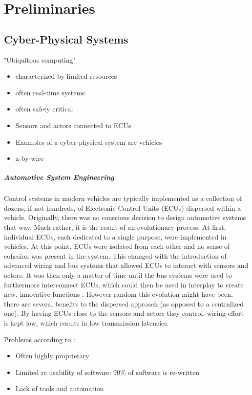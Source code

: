 

\chapter{Preliminaries}\label{chapter:preliminaries}

\section{Cyber-Physical Systems}

"Ubiquitous computing"

\begin{itemize}
\item characterized by limited resources
\item often real-time systems
\item often safety critical
\item Sensors and actors connected to ECUs
\item Examples of a cyber-physical system are vehicles
\item x-by-wire
\end{itemize}


\paragraph{Automotive System Engineering}
Control systems in modern vehicles are typically implemented as a collection of dozens, if not hundreds, of Electronic Control Units (ECUs) dispersed within a vehicle. Originally, there was no conscious decision to design automotive systems that way. Much rather, it is the result of an evolutionary process. At first, individual ECUs, each dedicated to a single purpose, were implemented in vehicles. At this point, ECUs were isolated from each other and no sense of cohesion was present in the system. This changed with the introduction of advanced wiring and bus systems that allowed ECUs to interact with sensors and actors. It was then only a matter of time until the bus systems were used to furthermore interconnect ECUs, which could then be used in interplay to create new, innovative functions \cite{broy2006challenges}. However random this evolution might have been, there are several benefits to the dispersed approach (as opposed to a centralized one). By having ECUs close to the sensors and actors they control, wiring effort is kept low, which results in low transmission latencies. 

Problems according to \citeauthor*{broy2006challenges}:
\begin{itemize}
\item Often highly proprietary
\item Limited re usability of software: 90\% of software is re-written 
\item Lack of tools and automation
\end{itemize}


